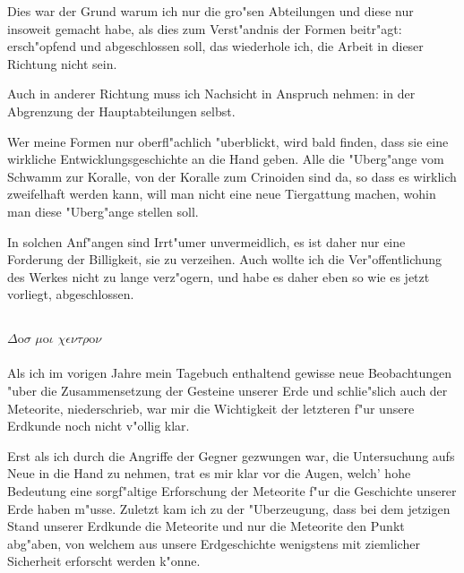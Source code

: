 \documentclass[a4paper, 11pt, oneside]{article}
\begin{document}
Dies war der Grund warum ich nur die gro"sen Abteilungen und diese nur insoweit gemacht habe, als dies zum Verst"andnis der Formen beitr"agt: ersch"opfend und abgeschlossen soll, das wiederhole ich, die Arbeit in dieser Richtung nicht sein.

Auch in anderer Richtung muss ich Nachsicht in Anspruch nehmen: in der Abgrenzung der Hauptabteilungen selbst.

Wer meine Formen nur oberfl"achlich "uberblickt, wird bald finden, dass sie eine wirkliche Entwicklungsgeschichte an die Hand geben. Alle die "Uberg"ange vom Schwamm zur Koralle, von der Koralle zum Crinoiden sind da, so dass es wirklich zweifelhaft werden kann, will man nicht eine neue Tiergattung machen, wohin man diese "Uberg"ange stellen soll.

In solchen Anf"angen sind Irrt"umer unvermeidlich, es ist daher nur eine Forderung der Billigkeit, sie zu verzeihen. Auch wollte ich die Ver"offentlichung des Werkes nicht zu lange verz"ogern, und habe es daher eben so wie es jetzt vorliegt, abgeschlossen.
\clearpage
\subsection{}
$\Delta$o$\sigma$ $\mu$o$\iota$ $\chi\epsilon\nu\tau\rho$o$\nu$%
\paragraph{}
Als ich im vorigen Jahre mein Tagebuch enthaltend gewisse neue Beobachtungen "uber die Zusammensetzung der Gesteine unserer Erde und schlie"slich auch der Meteorite, niederschrieb, war mir die Wichtigkeit der letzteren f"ur unsere Erdkunde noch nicht v"ollig klar.

Erst als ich durch die Angriffe der Gegner gezwungen war, die Untersuchung aufs Neue in die Hand zu nehmen, trat es mir klar vor die Augen, welch' hohe Bedeutung eine sorgf"altige Erforschung der Meteorite f"ur die Geschichte unserer Erde haben m"usse. Zuletzt kam ich zu der "Uberzeugung, dass bei dem jetzigen Stand unserer Erdkunde die Meteorite und nur die Meteorite den Punkt abg"aben, von welchem aus unsere Erdgeschichte wenigstens mit ziemlicher Sicherheit erforscht werden k"onne.
\end{document}
